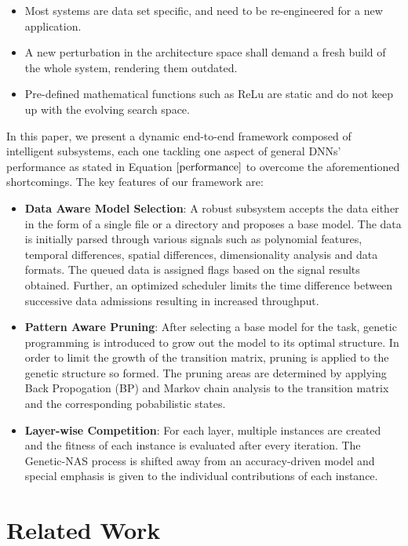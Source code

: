 \documentclass[conference]{IEEEtran}
\begin{document}
\begin{itemize}
\item Most systems are data set specific, and need to be re-engineered for a new application.
\item A new perturbation in the architecture space shall demand a fresh build of the whole system, rendering them outdated.
\item Pre-defined mathematical functions such as ReLu are static and do not keep up with the evolving search space.
\end{itemize}
In this paper, we present a dynamic end-to-end framework composed of intelligent subsystems, each one tackling one aspect of general DNNs' performance as stated in Equation $\ref{performance}$ to overcome the aforementioned shortcomings. The key features of our framework are:

\begin{itemize}
\item \textbf{Data Aware Model Selection}: A robust subsystem accepts the data either in the form of a single file or a directory and proposes a base model. The data is initially parsed through various signals such as polynomial features, temporal differences, spatial differences, dimensionality analysis and data formats. The queued data is assigned flags based on the signal results obtained. Further, an optimized scheduler limits the time difference between successive data admissions resulting in increased throughput.  
\item \textbf{Pattern Aware Pruning}: After selecting a base model for the task, genetic programming is introduced to grow out the model to its optimal structure. In order to limit the growth of the transition matrix, pruning is applied to the genetic structure so formed. The pruning areas are determined by applying Back Propogation (BP) and Markov chain analysis to the transition matrix and the corresponding pobabilistic states. 
\item \textbf{Layer-wise Competition}: For each layer, multiple instances are created and the fitness of each instance is evaluated after every iteration. The Genetic-NAS process is shifted away from an accuracy-driven model and special emphasis is given to the individual contributions of each instance.  
\end{itemize}

\section{Related Work}
\end{document}
